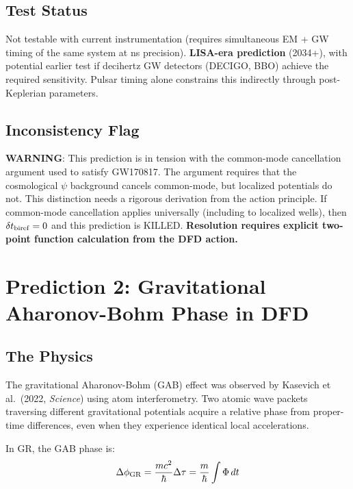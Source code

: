 \documentclass[11pt]{article}
\begin{document}
\subsection{Test Status}

Not testable with current instrumentation (requires simultaneous EM + GW timing of the
same system at ns precision). \textbf{LISA-era prediction} (2034+), with potential
earlier test if decihertz GW detectors (DECIGO, BBO) achieve the required sensitivity.
Pulsar timing alone constrains this indirectly through post-Keplerian parameters.

\subsection{Inconsistency Flag}

\textbf{WARNING}: This prediction is in tension with the common-mode cancellation
argument used to satisfy GW170817. The argument requires that the cosmological $\psi$
background cancels common-mode, but localized potentials do not. This distinction needs
a rigorous derivation from the action principle. If common-mode cancellation applies
universally (including to localized wells), then $\delta t_{\rm biref} = 0$ and this
prediction is KILLED. \textbf{Resolution requires explicit two-point function calculation
from the DFD action.}

\section{Prediction 2: Gravitational Aharonov-Bohm Phase in DFD}
\label{sec:gab}

\subsection{The Physics}

The gravitational Aharonov-Bohm (GAB) effect was observed by Kasevich et al.\ (2022,
\textit{Science}) using atom interferometry. Two atomic wave packets traversing different
gravitational potentials acquire a relative phase from proper-time differences, even when
they experience identical local accelerations.

In GR, the GAB phase is:
\begin{equation}
\Delta\phi_{\rm GR} = \frac{mc^2}{\hbar}\Delta\tau = \frac{m}{\hbar}\int \Phi\,dt
\end{equation}
\end{document}
